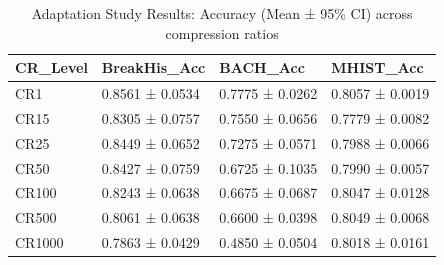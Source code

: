 \begin{table}
\caption{Adaptation Study Results: Accuracy (Mean ± 95\% CI) across compression ratios}
\label{tab:adaptation}
\begin{tabular}{llll}
\toprule
CR_Level & BreakHis_Acc & BACH_Acc & MHIST_Acc \\
\midrule
CR1 & 0.8561 ± 0.0534 & 0.7775 ± 0.0262 & 0.8057 ± 0.0019 \\
CR15 & 0.8305 ± 0.0757 & 0.7550 ± 0.0656 & 0.7779 ± 0.0082 \\
CR25 & 0.8449 ± 0.0652 & 0.7275 ± 0.0571 & 0.7988 ± 0.0066 \\
CR50 & 0.8427 ± 0.0759 & 0.6725 ± 0.1035 & 0.7990 ± 0.0057 \\
CR100 & 0.8243 ± 0.0638 & 0.6675 ± 0.0687 & 0.8047 ± 0.0128 \\
CR500 & 0.8061 ± 0.0638 & 0.6600 ± 0.0398 & 0.8049 ± 0.0068 \\
CR1000 & 0.7863 ± 0.0429 & 0.4850 ± 0.0504 & 0.8018 ± 0.0161 \\
\bottomrule
\end{tabular}
\end{table}
